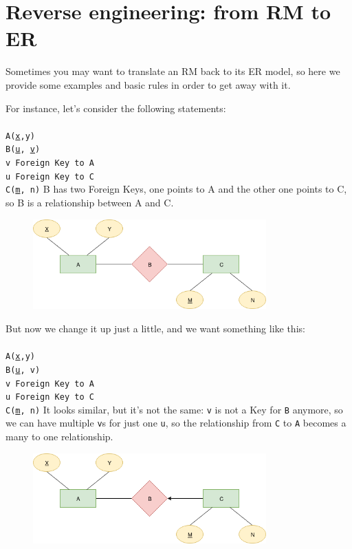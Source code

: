 \documentclass[class=book, crop=false, oneside]{standalone}
\newcommand\tab[1][1cm]{\hspace*{#1}}
\begin{document}
\chapter{Reverse engineering: from RM to ER}
Sometimes you may want to translate an RM back to its ER model, so here we provide some examples and basic rules in order to get away with it.

For instance, let's consider the following statements:\\\\
\texttt{A(\underline{x},y)}\\
\texttt{B(\underline{u}, \underline{v})}\\
\tab[.4cm] \texttt{v Foreign Key to A}\\
\tab[.4cm] \texttt{u Foreign Key to C}\\
\texttt{C(\underline{m}, n)}
\vskip 5pt
B has two Foreign Keys, one points to A and the other one points to C, so B is a relationship between A and C.
\begin{figure}[H]
	\includegraphics[width=0.8\textwidth,keepaspectratio]{diagram3_00.png}
	\caption{}
	\label{diagram3_00}
\end{figure}
\vskip 5pt
But now we change it up just a little, and we want something like this:\\\\
\texttt{A(\underline{x},y)}\\
\texttt{B(\underline{u}, v)}\\
\tab[.4cm] \texttt{v Foreign Key to A}\\
\tab[.4cm] \texttt{u Foreign Key to C}\\
\texttt{C(\underline{m}, n)}
\vskip 5pt
It looks similar, but it's not the same: \texttt{v} is not a Key for \texttt{B} anymore, so we can have multiple \texttt{v}s for just one \texttt{u}, so the relationship from \texttt{C} to \texttt{A} becomes a many to one relationship.
\begin{figure}[H]
	\includegraphics[width=0.8\textwidth,keepaspectratio]{diagram3_01.png}
	\caption{}
	\label{diagram3_01}
\end{figure}
\end{document}
